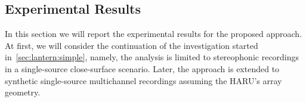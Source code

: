 

\subsection{Experimental Results}\label{sec:mirage:exp}
In this section we will report the experimental results for the proposed approach.
At first, we will consider the continuation of the investigation started in~\cref{sec:lantern:simple}, namely, the analysis is limited to stereophonic recordings in a single-source close-surface scenario.
Later, the approach is extended to synthetic single-source multichannel recordings assuming the HARU's array geometry.

